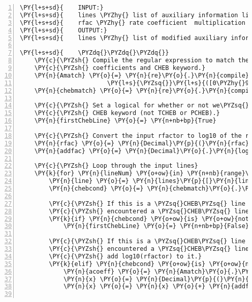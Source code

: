 \begin{Verbatim}[commandchars=\\\{\},fontsize=\small,numbers=left,firstnumber=1,stepnumber=2,firstline=2]
\PY{l+s+sd}{    INPUT:}
\PY{l+s+sd}{    lines \PYZhy{} list of auxiliary information lines to check}
\PY{l+s+sd}{    rfac \PYZhy{} rate coefficient  multiplication factor}
\PY{l+s+sd}{    OUTPUT:}
\PY{l+s+sd}{    lines \PYZhy{} list of modified auxiliary information lines}

\PY{l+s+sd}{    \PYZdq{}\PYZdq{}\PYZdq{}}
    \PY{c}{\PYZsh{} Compile the regular expression to match the Chebychev `a`}
    \PY{c}{\PYZsh{} coefficients and CHEB keyword.}
    \PY{n}{Amatch} \PY{o}{=} \PY{n}{re}\PY{o}{.}\PY{n}{compile}\PY{p}{(}\PY{l+s}{r\PYZsq{}}\PY{l+s}{(([\PYZhy{}+]?[0\PYZhy{}9]+(}\PY{l+s}{\PYZbs{}}\PY{l+s}{.[0\PYZhy{}9]+)?[eE][\PYZhy{}+]?[0\PYZhy{}9]+)|}\PY{l+s}{\PYZsq{}}
                        \PY{l+s}{\PYZsq{}}\PY{l+s}{([0\PYZhy{}9]+(}\PY{l+s}{\PYZbs{}}\PY{l+s}{.[0\PYZhy{}9]+)?))}\PY{l+s}{\PYZsq{}}\PY{p}{)}
    \PY{n}{chebmatch} \PY{o}{=} \PY{n}{re}\PY{o}{.}\PY{n}{compile}\PY{p}{(}\PY{l+s}{r\PYZsq{}}\PY{l+s}{(?i)\PYZca{}[}\PY{l+s}{\PYZbs{}}\PY{l+s}{s]*CHEB}\PY{l+s}{\PYZsq{}}\PY{p}{)}

    \PY{c}{\PYZsh{} Set a logical for whether or not we\PYZsq{}ve found the first line with a}
    \PY{c}{\PYZsh{} CHEB keyword (not TCHEB or PCHEB).}
    \PY{n}{firstChebLine} \PY{o}{=} \PY{n+nb+bp}{True}

    \PY{c}{\PYZsh{} Convert the input rfactor to log10 of the rfactor.}
    \PY{n}{rfac} \PY{o}{=} \PY{n}{Decimal}\PY{p}{(}\PY{n}{rfac}\PY{p}{)}
    \PY{n}{addfac} \PY{o}{=} \PY{n}{Decimal}\PY{o}{.}\PY{n}{log10}\PY{p}{(}\PY{n}{rfac}\PY{p}{)}

    \PY{c}{\PYZsh{} Loop through the input lines}
    \PY{k}{for} \PY{n}{lineNum} \PY{o+ow}{in} \PY{n+nb}{range}\PY{p}{(}\PY{n+nb}{len}\PY{p}{(}\PY{n}{lines}\PY{p}{)}\PY{p}{)}\PY{p}{:}
        \PY{n}{line} \PY{o}{=} \PY{n}{lines}\PY{p}{[}\PY{n}{lineNum}\PY{p}{]}
        \PY{n}{chebcond} \PY{o}{=} \PY{n}{chebmatch}\PY{o}{.}\PY{n}{search}\PY{p}{(}\PY{n}{line}\PY{p}{)}

        \PY{c}{\PYZsh{} If this is a \PYZsq{}CHEB\PYZsq{} line and its the first time we\PYZsq{}ve}
        \PY{c}{\PYZsh{} encountered a \PYZsq{}CHEB\PYZsq{} line, set `firstChebLine` to `False`}
        \PY{k}{if} \PY{n}{chebcond} \PY{o+ow}{is} \PY{o+ow}{not} \PY{n+nb+bp}{None} \PY{o+ow}{and} \PY{n}{firstChebLine}\PY{p}{:}
            \PY{n}{firstChebLine} \PY{o}{=} \PY{n+nb+bp}{False}

        \PY{c}{\PYZsh{} If this is a \PYZsq{}CHEB\PYZsq{} line and it is not the first time we\PYZsq{}ve}
        \PY{c}{\PYZsh{} encountered a \PYZsq{}CHEB\PYZsq{} line, match the a\PYZus{}(1,1) coefficient, and}
        \PY{c}{\PYZsh{} add log10(rfactor) to it.}
        \PY{k}{elif} \PY{n}{chebcond} \PY{o+ow}{is} \PY{o+ow}{not} \PY{n+nb+bp}{None} \PY{o+ow}{and} \PY{o+ow}{not} \PY{n}{firstChebLine}\PY{p}{:}
            \PY{n}{acoeff} \PY{o}{=} \PY{n}{Amatch}\PY{o}{.}\PY{n}{search}\PY{p}{(}\PY{n}{line}\PY{p}{)}
            \PY{n}{x} \PY{o}{=} \PY{n}{Decimal}\PY{p}{(}\PY{n}{acoeff}\PY{o}{.}\PY{n}{group}\PY{p}{(}\PY{l+m+mi}{1}\PY{p}{)}\PY{p}{)}
            \PY{n}{x} \PY{o}{=} \PY{n}{x} \PY{o}{+} \PY{n}{addfac}


\end{Verbatim}
